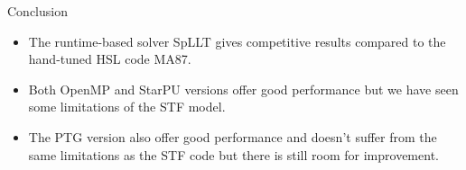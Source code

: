 \documentclass{beamer}
\newcommand{\db}[1]{\textcolor{mblue}{#1\xspace}}
\begin{document}
\begin{frame}{Conclusion}
  \begin{itemize}
  \item The \alert{runtime-based} solver \db{SpLLT} gives competitive
    results compared to the \db{hand-tuned HSL code MA87}.

    \vspace{0.4cm}

  \item Both \alert{OpenMP} and \alert{StarPU} versions offer good
    performance but we have seen some limitations of the \db{STF
      model}.

    \vspace{0.4cm}

  \item The \alert{PTG} version also offer good performance and
    doesn't suffer from the same limitations as the \alert{STF} code
    but there is still room for improvement.
  \end{itemize}
\end{frame}
\end{document}
